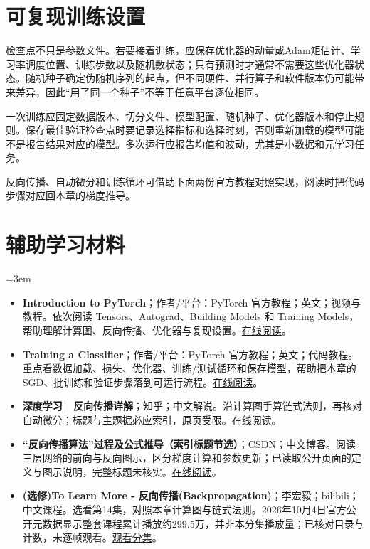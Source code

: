 \section{可复现训练设置}
检查点不只是参数文件。若要接着训练，应保存优化器的动量或Adam矩估计、学习率调度位置、训练步数以及随机数状态；只有预测时才通常不需要这些优化器状态。随机种子确定伪随机序列的起点，但不同硬件、并行算子和软件版本仍可能带来差异，因此“用了同一个种子”不等于任意平台逐位相同。

一次训练应固定数据版本、切分文件、模型配置、随机种子、优化器版本和停止规则。保存最佳验证检查点时要记录选择指标和选择时刻，否则重新加载的模型可能不是报告结果对应的模型。多次运行应报告均值和波动，尤其是小数据和元学习任务。

反向传播、自动微分和训练循环可借助下面两份官方教程对照实现，阅读时把代码步骤对应回本章的梯度推导。
\section*{辅助学习材料}
\begingroup
\emergencystretch=3em
\begin{itemize}
\item \textbf{Introduction to PyTorch}；作者/平台：PyTorch 官方教程；英文；视频与教程。依次阅读 Tensors、Autograd、Building Models 和 Training Models，帮助理解计算图、反向传播、优化器与复现设置。\href{https://docs.pytorch.org/tutorials/beginner/introyt/introyt1\_tutorial.html}{在线阅读}。
\item \textbf{Training a Classifier}；作者/平台：PyTorch 官方教程；英文；代码教程。重点看数据加载、损失、优化器、训练/测试循环和保存模型，帮助把本章的 SGD、批训练和验证步骤落到可运行流程。\href{https://docs.pytorch.org/tutorials/beginner/blitz/cifar10\_tutorial.html}{在线阅读}。
\item \textbf{深度学习 | 反向传播详解}；知乎；中文解说。沿计算图手算链式法则，再核对自动微分；标题与主题据必应索引，原页受限。\href{https://zhuanlan.zhihu.com/p/115571464}{在线阅读}。
\item \textbf{“反向传播算法”过程及公式推导（索引标题节选）}；CSDN；中文博客。阅读三层网络的前向与反向图示，区分梯度计算和参数更新；已读取公开页面的定义与图示说明，完整标题未核实。\href{https://blog.csdn.net/ft\_sunshine/article/details/90221691}{在线阅读}。
\item \textbf{(选修)To Learn More - 反向传播(Backpropagation)}；李宏毅；bilibili；中文课程。选看第14集，对照本章计算图与链式法则。2026年10月4日官方公开元数据显示整套课程累计播放约299.5万，并非本分集播放量；已核对目录与计数，未逐帧观看。\href{https://www.bilibili.com/video/BV1Wv411h7kN/?p=14}{观看分集}。
\end{itemize}
\endgroup
